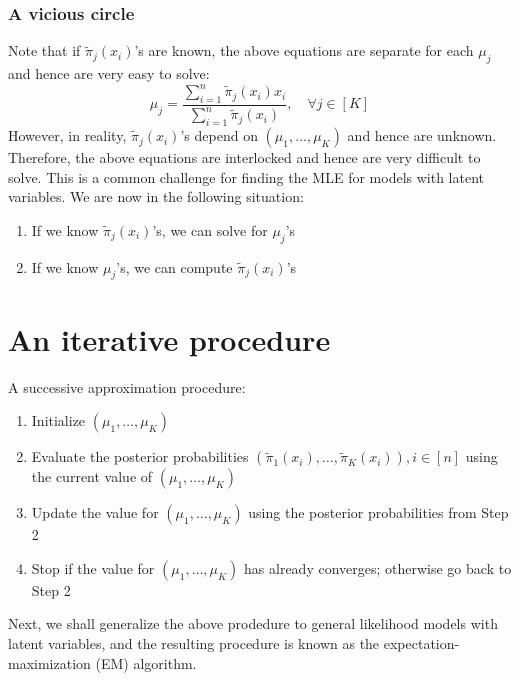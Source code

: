 \subsubsection{A vicious circle}
Note that if $\tilde{\pi}_j(x_i)$'s are known, the above equations are separate for each
$\mu_j$ and hence are very easy to solve: %
\[
    \mu_j = \frac{\sum_{i=1}^n \tilde{\pi}_j(x_i)x_i}{\sum_{i=1}^n \tilde{\pi}_j(x_i)}, \quad\forall j\in[K]
\]
However, in reality, $\tilde{\pi}_j(x_i)$'s depend on $(\mu_1, \dots, \mu_K)$ and hence are unknown. Therefore,
the above equations are interlocked and hence are very difficult to solve. This is a common challenge for
finding the MLE for models with latent variables. We are now in the following situation:
\begin{enumerate}
    \item If we know $\tilde{\pi}_j(x_i)$'s, we can solve for $\mu_j$'s
    \item If we know $\mu_j$'s, we can compute $\tilde{\pi}_j(x_i)$'s
\end{enumerate}
\section{An iterative procedure}
A successive approximation procedure:
\begin{enumerate}
    \item Initialize $(\mu_1, \dots, \mu_K)$
    \item Evaluate the posterior probabilities $(\tilde{\pi}_1(x_i), \dots, \tilde{\pi}_K(x_i)), i \in [n]$ using the current value of $(\mu_1, \dots, \mu_K)$
    \item Update the value for $(\mu_1, \dots, \mu_K)$ using the posterior probabilities from Step 2
    \item Stop if the value for $(\mu_1, \dots, \mu_K)$ has already converges; otherwise go back to Step 2
\end{enumerate}
Next, we shall generalize the above prodedure to general likelihood models with latent variables, and the resulting procedure is known as
the expectation-maximization (EM) algorithm.
